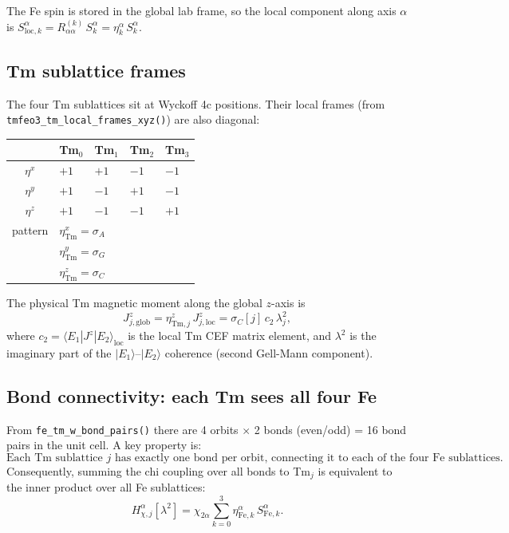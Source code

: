 \documentclass[11pt,a4paper]{article}
\newcommand{\sG}{\sigma_G}
\newcommand{\sA}{\sigma_A}
\newcommand{\sC}{\sigma_C}
\newcommand{\etaz}{\eta^z}
\newcommand{\etax}{\eta^x}
\newcommand{\etay}{\eta^y}
\newcommand{\lamt}{\lambda^2}
\begin{document}
The Fe spin is stored in the global lab frame, so the local component along
axis $\alpha$ is $S^\alpha_{\mathrm{loc},k} = R^{(k)}_{\alpha\alpha}\,S^\alpha_k
= \eta^\alpha_k\,S^\alpha_k$.

\subsection{Tm sublattice frames}

The four Tm sublattices sit at Wyckoff 4c positions.  Their local frames
(from \texttt{tmfeo3\_tm\_local\_frames\_xyz()}) are also diagonal:
\begin{center}
\begin{tabular}{cllll}
\toprule
 & Tm$_0$ & Tm$_1$ & Tm$_2$ & Tm$_3$ \\
\midrule
$\eta^x$ & $+1$ & $+1$ & $-1$ & $-1$ \\
$\eta^y$ & $+1$ & $-1$ & $+1$ & $-1$ \\
$\eta^z$ & $+1$ & $-1$ & $-1$ & $+1$ \\
\midrule
pattern & \multicolumn{2}{l}{$\etax_{\mathrm{Tm}} = \sA$} & \multicolumn{2}{l}{} \\
        & \multicolumn{2}{l}{$\etay_{\mathrm{Tm}} = \sG$} & \multicolumn{2}{l}{} \\
        & \multicolumn{2}{l}{$\etaz_{\mathrm{Tm}} = \sC$} & \multicolumn{2}{l}{} \\
\bottomrule
\end{tabular}
\end{center}

The physical Tm magnetic moment along the global $z$-axis is
\begin{equation}
  J^z_{j,\mathrm{glob}} = \etaz_{\mathrm{Tm},j}\,J^z_{j,\mathrm{loc}}
                        = \sC[j]\,c_2\,\lamt_j,
  \label{eq:Jzglob}
\end{equation}
where $c_2 = \langle E_1|J^z|E_2\rangle_{\mathrm{loc}}$ is the local Tm CEF
matrix element, and $\lamt$ is the imaginary part of the $|E_1\rangle$--$|E_2\rangle$
coherence (second Gell-Mann component).

\subsection{Bond connectivity: each Tm sees all four Fe}

From \texttt{fe\_tm\_w\_bond\_pairs()} there are 4 orbits $\times$ 2 bonds (even/odd)
= 16 bond pairs in the unit cell.  A key property is:
\begin{equation}
  \text{Each Tm sublattice $j$ has exactly one bond per orbit,
  connecting it to each of the four Fe sublattices.}
\end{equation}
Consequently, summing the chi coupling over all bonds to Tm$_j$ is equivalent
to the inner product over all Fe sublattices:
\begin{equation}
  H^\alpha_{\chi,j}[\lamt]
    = \chi_{2\alpha}\sum_{k=0}^{3} \eta^\alpha_{\mathrm{Fe},k}\,S^\alpha_{\mathrm{Fe},k}.
  \label{eq:Hchi_sum}
\end{equation}
\end{document}

